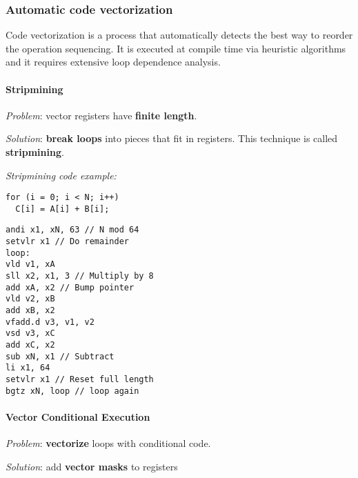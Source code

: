 \documentclass[english]{article}
\begin{document}
\subsubsection{Automatic code vectorization}

Code vectorization is a process that automatically detects the best way to reorder the operation sequencing.
It is executed at compile time via heuristic algorithms and it requires extensive loop dependence analysis.

\paragraph{Stripmining}

\textit{Problem}: vector registers have \textbf{finite length}.

\textit{Solution}: \textbf{break loops} into pieces that fit in registers.
This technique is called \textbf{stripmining}.

\textit{Stripmining code example:}

\begin{minipage}[t]{0.495\textwidth}
  \begin{verbatim}
for (i = 0; i < N; i++)
  C[i] = A[i] + B[i];
  \end{verbatim}
\end{minipage}
\begin{minipage}[t]{0.495\textwidth}
  \begin{verbatim}
andi x1, xN, 63 // N mod 64
setvlr x1 // Do remainder
loop:
vld v1, xA
sll x2, x1, 3 // Multiply by 8
add xA, x2 // Bump pointer
vld v2, xB
add xB, x2
vfadd.d v3, v1, v2
vsd v3, xC
add xC, x2
sub xN, x1 // Subtract
li x1, 64
setvlr x1 // Reset full length
bgtz xN, loop // loop again
  \end{verbatim}
\end{minipage}

\begin{figure}[htbp]
  \centering
\end{figure}

\paragraph{Vector Conditional Execution}
\label{par:vector-conditional-execution}

\textit{Problem}: \textbf{vectorize} loops with conditional code.

\textit{Solution}: add \textbf{vector masks} to registers
\end{document}
